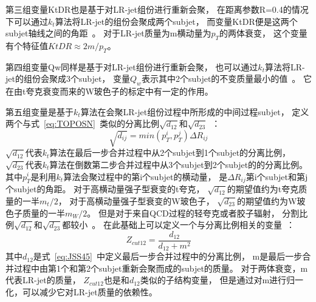 第三组变量KtDR也是基于对LR-jet组份进行重新会聚，
在距离参数R=0.4的情况下可以通过$k_t$算法将LR-jet的组份会聚成两个subjet，
而变量KtDR便是这两个subjet轴线之间的角距~\cite{JSS14}。
对于LR-jet质量为m横动量为$p_T$的两体衰变，
这个变量有个特征值$KtDR\approx 2m/p_T$。

第四组变量Qw同样是基于对LR-jet组份进行重新会聚，
也可以通过$k_t$算法将LR-jet的组份会聚成3个subjet，
变量$Q_w$表示其中2个subjet的不变质量最小的值~\cite{JSS8}。
它在由t夸克衰变而来的W玻色子的标定中有一定的作用。

第五组变量是基于$k_t$算法在会聚LR-jet组份过程中所形成的中间过程subjet，
定义两个与式~\ref{eq:TOPOSN}~类似的分离比例$\sqrt{d_{12}}$和$\sqrt{d_{23}}$~\cite{JSS10}：
\begin{equation} 
\label{eq:JSS45}
\sqrt{d_{ij}}=min(p_T^i,p_T^j)\Delta R_{ij}
\end{equation}
$\sqrt{d_{12}}$代表$k_t$算法在最后一步合并过程中从2个subjet到1个subjet的分离比例，
$\sqrt{d_{23}}$代表$k_t$算法在倒数第二步合并过程中从3个subjet到2个subjet的的分离比例。
其中$p_T^i$是利用$k_t$算法会聚过程中的第i个subjet的横动量，
是$\Delta R_{ij}$第i个subjet和第j个subjet的角距。
对于高横动量强子型衰变的t夸克，
$\sqrt{d_{12}}$的期望值约为t夸克质量的一半$m_t/2$，
对于高横动量强子型衰变的W玻色子，
$\sqrt{d_{23}}$的期望值约为W玻色子质量的一半$m_W/2$。
但是对于来自QCD过程的轻夸克或者胶子辐射，
分割比例$\sqrt{d_{12}}$和$\sqrt{d_{23}}$都较小~\cite{JSD12}。
在此基础上可以定义一个与分离比例相关的变量~\cite{JSS8}：
\begin{equation} 
\label{eq:JSS46}
Z_{cut12}=\frac{d_{12}}{d_{12}+m^2}
\end{equation}
其中$d_{12}$是式~\ref{eq:JSS45}~中定义最后一步合并过程中的分离比例，
m是最后一步合并过程中由第1个和第2个subjet重新会聚而成的subjet的质量。
对于两体衰变，m代表LR-jet的质量，
$Z_{cut12}$也是和$d_{12}$类似的子结构变量，
但是通过对m进行归一化，可以减少它对LR-jet质量的依赖性。


